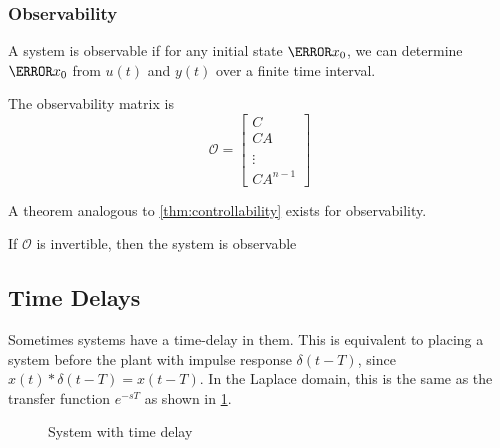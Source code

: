 \subsubsection{Observability}
\begin{definition}
  A system is observable if for any initial state $\V{x}_0$, we can determine $\V{x}_0$ from $u(t)$ and $y(t)$ over a finite time interval.
  \label{defn:observability}
\end{definition}
\begin{definition}
  The observability matrix is
  \[
	\mathcal{O} = \begin{bmatrix} C \\ CA \\ \\ \vdots \\ CA^{n-1} \end{bmatrix}
  \]
  \label{defn:observability-matrix}
\end{definition}
A theorem analogous to \cref{thm:controllability} exists for observability.
\begin{theorem}
  If $\mathcal{O}$ is invertible, then the system is observable
  \label{thm:observability}
\end{theorem}
\subsection{Time Delays}
Sometimes systems have a time-delay in them. This is equivalent to placing a system before the plant with impulse response $\delta(t-T)$, since $x(t)*\delta(t-T) = x(t-T)$.
In the Laplace domain, this is the same as the transfer function $e^{-sT}$ as shown in \cref{fig:time-delay}.
\begin{figure}[H]
    \centering 
    \caption{System with time delay}
    \label{fig:time-delay}
\end{figure}
